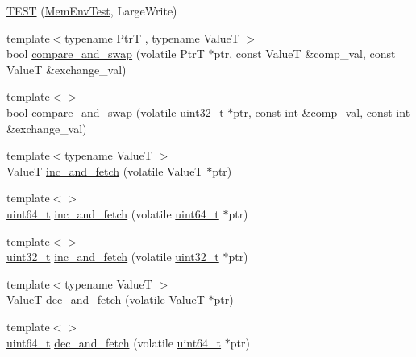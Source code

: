 \begin{DoxyCompactItemize}
\item 
\hyperlink{namespaceleveldb_a0af1e0377067cb2229d2ac1f66851040}{T\+E\+S\+T} (\hyperlink{classleveldb_1_1_mem_env_test}{Mem\+Env\+Test}, Large\+Write)
\item 
{\footnotesize template$<$typename Ptr\+T , typename Value\+T $>$ }\\bool \hyperlink{namespaceleveldb_af5322e69459aac7a07f6a82d759e6c44}{compare\+\_\+and\+\_\+swap} (volatile Ptr\+T $\ast$ptr, const Value\+T \&comp\+\_\+val, const Value\+T \&exchange\+\_\+val)
\item 
{\footnotesize template$<$$>$ }\\bool \hyperlink{namespaceleveldb_a73d05b39e210c5323659e9dd619dd312}{compare\+\_\+and\+\_\+swap} (volatile \hyperlink{stdint_8h_a435d1572bf3f880d55459d9805097f62}{uint32\+\_\+t} $\ast$ptr, const int \&comp\+\_\+val, const int \&exchange\+\_\+val)
\item 
{\footnotesize template$<$typename Value\+T $>$ }\\Value\+T \hyperlink{namespaceleveldb_a67927dd93f0898faf24c57287d80711d}{inc\+\_\+and\+\_\+fetch} (volatile Value\+T $\ast$ptr)
\item 
{\footnotesize template$<$$>$ }\\\hyperlink{stdint_8h_aaa5d1cd013383c889537491c3cfd9aad}{uint64\+\_\+t} \hyperlink{namespaceleveldb_a22ae82bd0b60b9b512a2d214b535aba9}{inc\+\_\+and\+\_\+fetch} (volatile \hyperlink{stdint_8h_aaa5d1cd013383c889537491c3cfd9aad}{uint64\+\_\+t} $\ast$ptr)
\item 
{\footnotesize template$<$$>$ }\\\hyperlink{stdint_8h_a435d1572bf3f880d55459d9805097f62}{uint32\+\_\+t} \hyperlink{namespaceleveldb_a16e4f8442462f6e89593d482b09d6739}{inc\+\_\+and\+\_\+fetch} (volatile \hyperlink{stdint_8h_a435d1572bf3f880d55459d9805097f62}{uint32\+\_\+t} $\ast$ptr)
\item 
{\footnotesize template$<$typename Value\+T $>$ }\\Value\+T \hyperlink{namespaceleveldb_a437024ea38c14ba5841de02d0f38fbb5}{dec\+\_\+and\+\_\+fetch} (volatile Value\+T $\ast$ptr)
\item 
{\footnotesize template$<$$>$ }\\\hyperlink{stdint_8h_aaa5d1cd013383c889537491c3cfd9aad}{uint64\+\_\+t} \hyperlink{namespaceleveldb_af76014c7795484842e886b5fa79ceb4f}{dec\+\_\+and\+\_\+fetch} (volatile \hyperlink{stdint_8h_aaa5d1cd013383c889537491c3cfd9aad}{uint64\+\_\+t} $\ast$ptr)
\item 

\end{DoxyCompactItemize}
